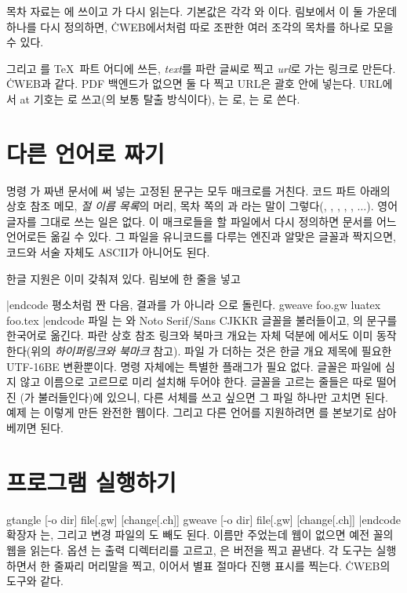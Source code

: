 목차 자료는 에 쓰이고 가 다시 읽는다.
기본값은 각각 와 이다.
림보에서 이 둘 가운데 하나를 다시 정의하면, \.{CWEB}에서처럼 따로 조판한 여러
조각의 목차를 하나로 모을 수 있다.

그리고 를 \TeX\ 파트
어디에 쓰든, {\it text\/}를 파란 글씨로 찍고 {\it url\/}로 가는 링크로 만든다.
\.{CWEB}과 같다. PDF 백엔드가 없으면 둘 다 찍고 URL은 괄호 안에 넣는다. URL에서
at 기호는 로 쓰고(의 보통 탈출 방식이다), 는
로, 는 로 쓴다.

\chapter{다른 언어로 짜기}
\noindent 명령 가 짜낸 문서에 써 넣는 고정된 문구는 모두 매크로를
거친다. 코드 파트 아래의 상호 참조 메모, {\it 절 이름 목록\/}의 머리, 목차
쪽의 과 라는 말이 그렇다(, ,
, , , $\ldots$). 영어 글자를
그대로 쓰는 일은 없다. 이 매크로들을 할 파일에서 다시 정의하면
문서를 어느 언어로든 옮길 수 있다. 그 파일을 유니코드를 다루는 엔진과 알맞은
글꼴과 짝지으면, 코드와 서술 자체도 ASCII가 아니어도 된다.

한글 지원은 이미 갖춰져 있다. 림보에 한 줄을 넣고
\begincode

|endcode
평소처럼 짠 다음, 결과를 가 아니라 으로 돌린다.
\begincode
gweave foo.gw
luatex foo.tex
|endcode
파일 는 와 Noto Serif/Sans CJK\thinspace KR
글꼴을 불러들이고, 의 문구를 한국어로 옮긴다. 파란 상호 참조
링크와 북마크 개요는  자체 덕분에 에서도 이미
동작한다(위의 {\it 하이퍼링크와 북마크\/} 참고). 파일 가
더하는 것은 한글 개요 제목에 필요한 UTF-16BE 변환뿐이다. 명령 
자체에는 특별한 플래그가 필요 없다. 글꼴은 파일에 심지 않고 이름으로 고르므로
미리 설치해 두어야 한다. 글꼴을 고르는  줄들은 따로 떨어진
(가 불러들인다)에 있으니, 다른 서체를
쓰고 싶으면 그 파일 하나만 고치면 된다. 예제 는 이렇게 만든 완전한
웹이다. 그리고 다른 언어를 지원하려면 를 본보기로 삼아 베끼면
된다.

\chapter{프로그램 실행하기}
\begincode
gtangle [-o dir] file[.gw] [change[.ch]]
gweave  [-o dir] file[.gw] [change[.ch]]
|endcode
확장자 는, 그리고 변경 파일의 도 빼도 된다. 이름만 주었는데
 웹이 없으면 예전 꼴의  웹을 읽는다. 옵션
는 출력 디렉터리를 고르고, 은 버전을 찍고 끝낸다. 각
도구는 실행하면서 한 줄짜리 머리말을 찍고, 이어서 별표 절마다
 진행 표시를 찍는다. \.{CWEB}의 도구와 같다.

